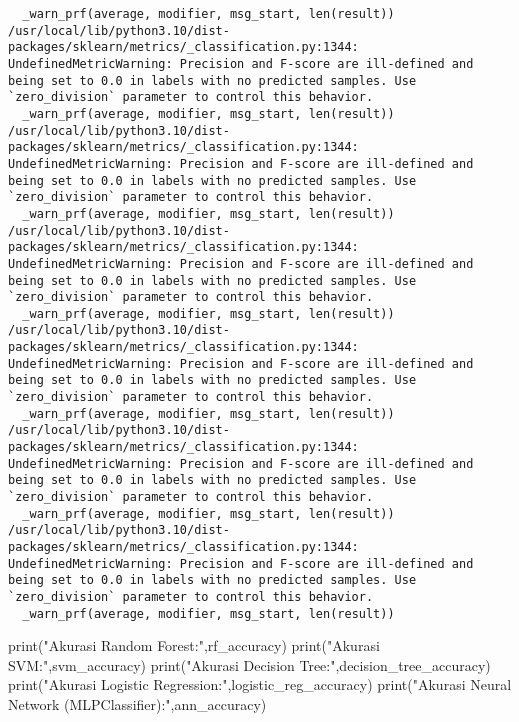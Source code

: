 \documentclass[
  letterpaper,
]{krantz}
\makeatletter
\newenvironment{Shaded}{\begin{snugshade}}{\end{snugshade}}
\newcommand{\BuiltInTok}[1]{\textcolor[rgb]{0.00,0.23,0.31}{#1}}
\newcommand{\NormalTok}[1]{\textcolor[rgb]{0.00,0.23,0.31}{#1}}
\newcommand{\StringTok}[1]{\textcolor[rgb]{0.13,0.47,0.30}{#1}}
\newenvironment{kframe}{%
\medskip{}
\setlength{\fboxsep}{.8em}
 \def\at@end@of@kframe{}%
 \ifinner\ifhmode%
  \def\at@end@of@kframe{\end{minipage}}%
  \begin{minipage}{\columnwidth}%
 \fi\fi%
 \def\FrameCommand##1{\hskip\@totalleftmargin \hskip-\fboxsep
 \colorbox{shadecolor}{##1}\hskip-\fboxsep
     \hskip-\linewidth \hskip-\@totalleftmargin \hskip\columnwidth}%
 \MakeFramed {\advance\hsize-\width
   \@totalleftmargin\z@ \linewidth\hsize
   \@setminipage}}%
 {\par\unskip\endMakeFramed%
 \at@end@of@kframe}
\renewenvironment{Shaded}{\begin{kframe}}{\end{kframe}}
\makeatother
\begin{document}
\begin{verbatim}
  _warn_prf(average, modifier, msg_start, len(result))
/usr/local/lib/python3.10/dist-packages/sklearn/metrics/_classification.py:1344: UndefinedMetricWarning: Precision and F-score are ill-defined and being set to 0.0 in labels with no predicted samples. Use `zero_division` parameter to control this behavior.
  _warn_prf(average, modifier, msg_start, len(result))
/usr/local/lib/python3.10/dist-packages/sklearn/metrics/_classification.py:1344: UndefinedMetricWarning: Precision and F-score are ill-defined and being set to 0.0 in labels with no predicted samples. Use `zero_division` parameter to control this behavior.
  _warn_prf(average, modifier, msg_start, len(result))
/usr/local/lib/python3.10/dist-packages/sklearn/metrics/_classification.py:1344: UndefinedMetricWarning: Precision and F-score are ill-defined and being set to 0.0 in labels with no predicted samples. Use `zero_division` parameter to control this behavior.
  _warn_prf(average, modifier, msg_start, len(result))
/usr/local/lib/python3.10/dist-packages/sklearn/metrics/_classification.py:1344: UndefinedMetricWarning: Precision and F-score are ill-defined and being set to 0.0 in labels with no predicted samples. Use `zero_division` parameter to control this behavior.
  _warn_prf(average, modifier, msg_start, len(result))
/usr/local/lib/python3.10/dist-packages/sklearn/metrics/_classification.py:1344: UndefinedMetricWarning: Precision and F-score are ill-defined and being set to 0.0 in labels with no predicted samples. Use `zero_division` parameter to control this behavior.
  _warn_prf(average, modifier, msg_start, len(result))
/usr/local/lib/python3.10/dist-packages/sklearn/metrics/_classification.py:1344: UndefinedMetricWarning: Precision and F-score are ill-defined and being set to 0.0 in labels with no predicted samples. Use `zero_division` parameter to control this behavior.
  _warn_prf(average, modifier, msg_start, len(result))
\end{verbatim}

\begin{Shaded}
\begin{Highlighting}[]
\BuiltInTok{print}\NormalTok{(}\StringTok{"Akurasi Random Forest:"}\NormalTok{,rf\_accuracy)}
\BuiltInTok{print}\NormalTok{(}\StringTok{"Akurasi SVM:"}\NormalTok{,svm\_accuracy)}
\BuiltInTok{print}\NormalTok{(}\StringTok{"Akurasi Decision Tree:"}\NormalTok{,decision\_tree\_accuracy)}
\BuiltInTok{print}\NormalTok{(}\StringTok{"Akurasi Logistic Regression:"}\NormalTok{,logistic\_reg\_accuracy)}
\BuiltInTok{print}\NormalTok{(}\StringTok{"Akurasi Neural Network (MLPClassifier):"}\NormalTok{,ann\_accuracy)}

\end{Highlighting}
\end{Shaded}
\end{document}
